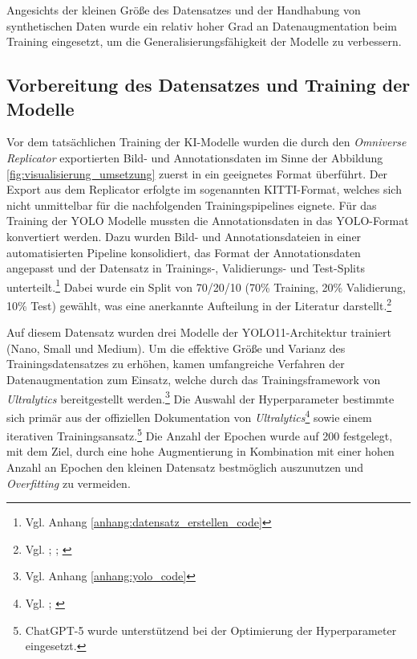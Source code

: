Angesichts der kleinen Größe des Datensatzes und der Handhabung von synthetischen Daten wurde ein relativ hoher Grad an Datenaugmentation beim Training eingesetzt, um die Generalisierungsfähigkeit der Modelle zu verbessern.

\subsection{Vorbereitung des Datensatzes und Training der Modelle}
Vor dem tatsächlichen Training der \ac{KI}-Modelle wurden die durch den \textit{Omniverse Replicator} exportierten Bild- und Annotationsdaten im Sinne der Abbildung \ref{fig:visualisierung_umsetzung} zuerst in ein geeignetes Format überführt. Der Export aus dem Replicator erfolgte im sogenannten KITTI-Format, welches sich nicht unmittelbar für die nachfolgenden Trainingspipelines eignete. Für das Training der \ac{YOLO} Modelle mussten die Annotationsdaten in das \ac{YOLO}-Format konvertiert werden. Dazu wurden Bild- und Annotationsdateien in einer automatisierten Pipeline konsolidiert, das Format der Annotationsdaten angepasst und der Datensatz in Trainings-, Validierungs- und Test-Splits unterteilt.\footnote{Vgl. Anhang  \ref{anhang:datensatz_erstellen_code}} Dabei wurde ein Split von 70/20/10 (70\% Training, 20\% Validierung, 10\% Test) gewählt, was eine anerkannte Aufteilung in der Literatur darstellt.\footnote{Vgl. 
\cite[261]{urgo_monitoring_2024}; \cite[3]{griem_synthetic_2025}; \cite[5]{khirodkar_domain_2018}}

Auf diesem Datensatz wurden drei Modelle der YOLO11-Architektur trainiert (Nano, Small und Medium). Um die effektive Größe und Varianz des Trainingsdatensatzes zu erhöhen, kamen umfangreiche Verfahren der Datenaugmentation zum Einsatz, welche durch das Trainingsframework von \textit{Ultralytics} bereitgestellt werden.\footnote{Vgl. Anhang \ref{anhang:yolo_code}} Die Auswahl der Hyperparameter bestimmte sich primär aus der offiziellen Dokumentation von \textit{Ultralytics}\footnote{Vgl. \cite{ultralytics_hyperparameter-optimierung_nodate}; \cite{ultralytics_yolo-datenerweiterung_nodate}} sowie einem iterativen Trainingsansatz.\footnote{ChatGPT-5 wurde unterstützend bei der Optimierung der Hyperparameter eingesetzt.} Die Anzahl der Epochen wurde auf 200 festgelegt, mit dem Ziel, durch eine hohe Augmentierung in Kombination mit einer hohen Anzahl an Epochen den kleinen Datensatz bestmöglich auszunutzen und \textit{Overfitting} zu vermeiden.

